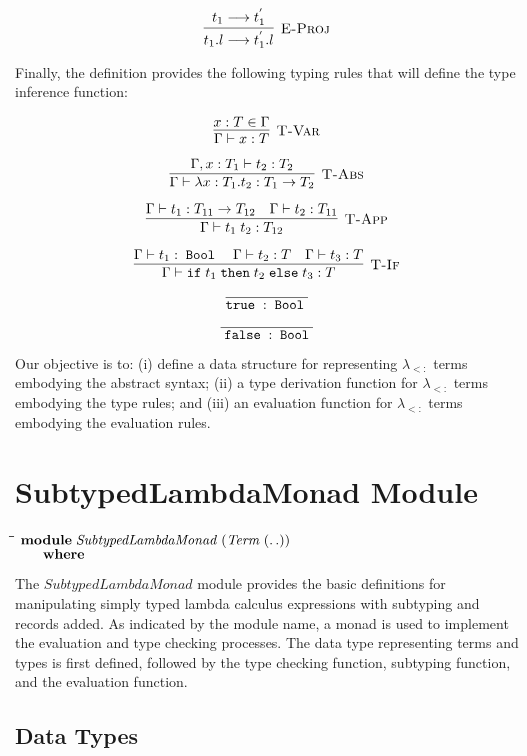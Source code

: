 \documentclass[10pt]{article}
\newlength{\lwidth}\setlength{\lwidth}{4.5cm}
\newlength{\cwidth}\setlength{\cwidth}{8mm} %
\newcommand{\Conid}[1]{\mathit{#1}}
\newcommand{\IF}{\ensuremath{\mathtt{ if \;}}}
\newcommand{\THEN}{\ensuremath{\mathtt{\; then \;}}}
\newcommand{\ELSE}{\ensuremath{\mathtt{\; else \;}}}
\newcommand{\TRUE}{\ensuremath{\mathtt{ true \;}}}
\newcommand{\FALSE}{\ensuremath{\mathtt{\; false \;}}}
\newcommand{\BOOL}{\ensuremath{\mathtt{\; Bool \;}}}
\begin{document}
\[\vcenter{\infer[\textsc{E-Proj}]
  {t_1.l \longrightarrow t_1^{'}.l}
  {t_1 \longrightarrow t_1^{'}}}\]

Finally, the definition provides the following typing rules that will
define the type inference function:

\[\vcenter{\infer[\textsc{T-Var}]{\Gamma\vdash x:T}{x:T\in\Gamma}}\]

\[\vcenter{\infer[\textsc{T-Abs}]
  {\Gamma\vdash\lambda x:T_1.t_2 : T_1\rightarrow T_2}
  {\Gamma,x:T_1\vdash t_2 : T_2}}
\]

\[\vcenter{\infer[\textsc{T-App}]
  {\Gamma\vdash t_1\; t_2 : T_{12}}
  {\Gamma\vdash t_1 : T_{11}\rightarrow T_{12} & \Gamma\vdash t_2:T_{11}}}
\]

\[\vcenter{\infer[\textsc{T-If}]
  {\Gamma\vdash \IF t_1 \THEN t_2 \ELSE t_3 : T}
  {\Gamma\vdash t_1 : \BOOL & \Gamma\vdash t_2 : T & \Gamma\vdash t_3 : T}}
\]

\[\vcenter{\infer{\TRUE:\BOOL}{}}\]

\[\vcenter{\infer{\FALSE:\BOOL}{}}\]

Our objective is to: (i) define a data structure for representing
$\lambda_{<:}$ terms embodying the abstract syntax; (ii) a type
derivation function for $\lambda_{<:}$ terms embodying the type
rules; and (iii) an evaluation function for $\lambda_{<:}$
terms embodying the evaluation rules.

\section{SubtypedLambdaMonad Module}

\begin{tabbing}
\qquad\=\hspace{\lwidth}\=\hspace{\cwidth}\=\+\kill
${\mathbf{module}\;\Conid{SubtypedLambdaMonad}\;(\Conid{Term}\;(\mathinner{\ldotp\ldotp}))}$\\
${\hskip2.00em\relax\mathbf{where}}$
\end{tabbing}
The \ensuremath{\Conid{SubtypedLambdaMonad}} module provides the basic definitions for
manipulating simply typed lambda calculus expressions with subtyping
and records added.  As indicated by the module name, a monad is used
to implement the evaluation and type checking processes.  The data
type representing terms and types is first defined, followed by the
type checking function, subtyping function, and the evaluation
function.

\subsection{Data Types}
\end{document}
